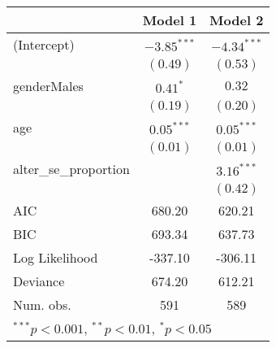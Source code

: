 
\begin{table}
\begin{tabular}{l c c }
\hline
 & Model 1 & Model 2 \\
\hline
(Intercept)           & $-3.85^{***}$ & $-4.34^{***}$ \\
                      & $(0.49)$      & $(0.53)$      \\
genderMales           & $0.41^{*}$    & $0.32$        \\
                      & $(0.19)$      & $(0.20)$      \\
age                   & $0.05^{***}$  & $0.05^{***}$  \\
                      & $(0.01)$      & $(0.01)$      \\
alter\_se\_proportion &               & $3.16^{***}$  \\
                      &               & $(0.42)$      \\
\hline
AIC                   & 680.20        & 620.21        \\
BIC                   & 693.34        & 637.73        \\
Log Likelihood        & -337.10       & -306.11       \\
Deviance              & 674.20        & 612.21        \\
Num. obs.             & 591           & 589           \\
\hline
\multicolumn{3}{l}{\scriptsize{$^{***}p<0.001$, $^{**}p<0.01$, $^*p<0.05$}}
\end{tabular}
\end{table}
